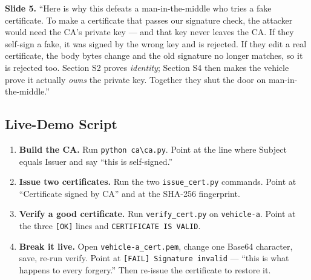 \documentclass[11pt,a4paper]{report}
\begin{document}
\textbf{Slide 5.} ``Here is why this defeats a man-in-the-middle who tries a fake
certificate. To make a certificate that passes our signature check, the attacker
would need the CA's private key --- and that key never leaves the CA. If they
self-sign a fake, it was signed by the wrong key and is rejected. If they edit a
real certificate, the body bytes change and the old signature no longer matches,
so it is rejected too. Section S2 proves \emph{identity}; Section S4 then makes
the vehicle prove it actually \emph{owns} the private key. Together they shut the
door on man-in-the-middle.''

\subsection{Live-Demo Script}
\begin{enumerate}
  \item \textbf{Build the CA.} Run \texttt{python ca\textbackslash ca.py}. Point
        at the line where Subject equals Issuer and say ``this is self-signed.''
  \item \textbf{Issue two certificates.} Run the two
        \texttt{issue\_cert.py} commands. Point at ``Certificate signed by CA''
        and at the SHA-256 fingerprint.
  \item \textbf{Verify a good certificate.} Run \texttt{verify\_cert.py} on
        \texttt{vehicle-a}. Point at the three \texttt{[OK]} lines and
        \texttt{CERTIFICATE IS VALID}.
  \item \textbf{Break it live.} Open \texttt{vehicle-a\_cert.pem}, change one
        Base64 character, save, re-run verify. Point at
        \texttt{[FAIL] Signature invalid} --- ``this is what happens to every
        forgery.'' Then re-issue the certificate to restore it.
\end{enumerate}
\end{document}
